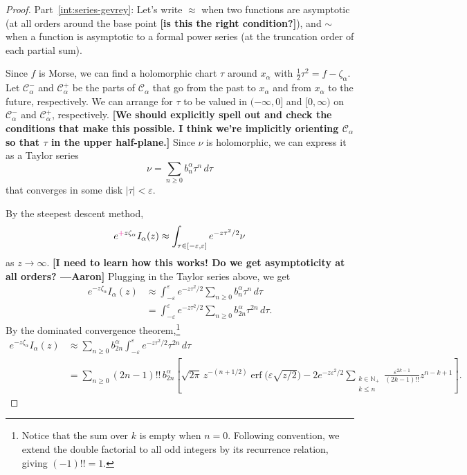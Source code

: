 \documentclass{article}
\begin{document}
\begin{proof}
Part~\eqref{int:series-gevrey}: Let's write $\approx$ when two functions are asymptotic (at all orders around the base point \textbf{[is this the right condition?]}), and $\sim$ when a function is asymptotic to a formal power series (at the truncation order of each partial sum).

Since $f$ is Morse, we can find a holomorphic chart $\tau$ around $x_\alpha$ with $\tfrac{1}{2} \tau^2 = f - \zeta_\alpha$. Let $\mathcal{C}^-_\alpha$ and $\mathcal{C}^+_\alpha$ be the parts of $\mathcal{C}_\alpha$ that go from the past to $x_\alpha$ and from $x_\alpha$ to the future, respectively. We can arrange for $\tau$ to be valued in $(-\infty, 0]$ and $[0, \infty)$ on $\mathcal{C}^-_\alpha$ and $\mathcal{C}^+_\alpha$, respectively. \textbf{[We should explicitly spell out and check the conditions that make this possible. I think we're implicitly orienting $\mathcal{C}_\alpha$ so that $\tau$ in the upper half-plane.]} Since $\nu$ is holomorphic, we can express it as a Taylor series
\[ \nu = \sum_{n \ge 0} b_n^\alpha \tau^n\,d\tau \]
that converges in some disk $|\tau| < \varepsilon$.

By the steepest descent method,
\[ e^{\textcolor{magenta}{+}z\zeta_\alpha} I_\alpha(z) \approx \int_{\tau \in [-\varepsilon, \varepsilon]} e^{-z\tau^2/2} \nu \]
as $z \to \infty$. \textbf{[I need to learn how this works! Do we get asymptoticity at all orders? ---Aaron]} Plugging in the Taylor series above, we get
\begin{align*}
e^{-z\zeta_\alpha} I_\alpha(z) & \approx \int_{-\varepsilon}^\varepsilon e^{-z\tau^2/2} \sum_{n \ge 0} b_n^\alpha \tau^n\,d\tau \\
& = \int_{-\varepsilon}^\varepsilon e^{-z\tau^2/2} \sum_{n \ge 0} b_{2n}^\alpha \tau^{2n}\,d\tau.
\end{align*}
By the dominated convergence theorem,\footnote{Notice that the sum over $k$ is empty when $n = 0$. Following convention, we extend the double factorial to all odd integers by its recurrence relation, giving $(-1)!! = 1$.}
\begin{align*}
e^{-z\zeta_\alpha} I_\alpha(z) & \approx \sum_{n \ge 0} b_{2n}^\alpha \int_{-\varepsilon}^\varepsilon e^{-z\tau^2/2} \tau^{2n}\,d\tau \\
& = \sum_{n \ge 0} (2n-1)!!\,b_{2n}^\alpha \left[ \sqrt{2\pi}\,z^{-(n+1/2)} \operatorname{erf}\big(\varepsilon \sqrt{z/2}\big) - 2e^{-z\varepsilon^2/2} \sum_{\substack{k \in \mathbb{N}_+ \\ k \le n}} \frac{\varepsilon^{2k-1}}{(2k-1)!!} z^{n-k+1} \right].
\end{align*}


\end{proof}
\end{document}
